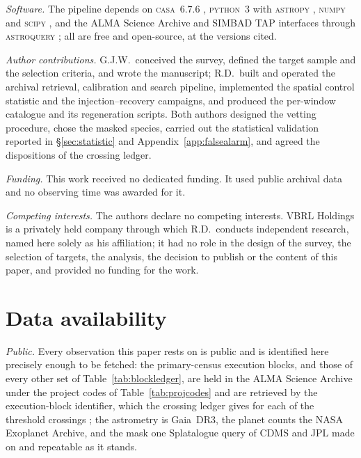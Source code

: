 \emph{Software.} The pipeline depends on \textsc{casa}~6.7.6
\citep{CASA2022}, \textsc{python}~3 with \textsc{astropy} \citep{Astropy2022}, \textsc{numpy}
\citep{Harris2020} and \textsc{scipy} \citep{Virtanen2020}, and the ALMA Science
Archive and SIMBAD TAP interfaces through \textsc{astroquery} \citep{Ginsburg2019};
all are free and open-source, at the versions cited.

\emph{Author contributions.} G.J.W.\ conceived the survey, defined the target
sample and the selection criteria, and wrote the manuscript; R.D.\ built and
operated the archival retrieval, calibration and search pipeline, implemented
the spatial control statistic and the injection--recovery campaigns, and
produced the per-window catalogue and its regeneration scripts. Both authors
designed the vetting procedure, chose the masked species, carried out the
statistical validation reported in \S\ref{sec:statistic} and
Appendix~\ref{app:falsealarm}, and agreed the dispositions of the crossing
ledger.

\emph{Funding.} This work received no dedicated funding. It used public archival data and
no observing time was awarded for it.

\emph{Competing interests.} The authors declare no competing interests. VBRL Holdings is a privately
held company through which R.D.\ conducts independent research, named
here solely as his affiliation; it had no role in the design of the
survey, the selection of targets, the analysis, the decision to publish
or the content of this paper, and provided no funding for the work.

\section*{Data availability}
\label{sec:data}
\emph{Public.} Every observation this paper rests on is public and is
identified here precisely enough to be fetched: the \NEB{} primary-census
execution blocks, and those of every other set of
Table~\ref{tab:blockledger}, are held in the ALMA Science Archive under the
\NProjCodes{} project codes of Table~\ref{tab:projcodes} and are retrieved by
the execution-block identifier, which the crossing ledger gives for each of the
\EvNCrossRaw{} threshold crossings \citep{Chen2022}; the astrometry is
Gaia~DR3, the planet counts the NASA Exoplanet Archive, and the mask one
Splatalogue query of CDMS and JPL made on \McQueryDate{} and repeatable as it
stands.

